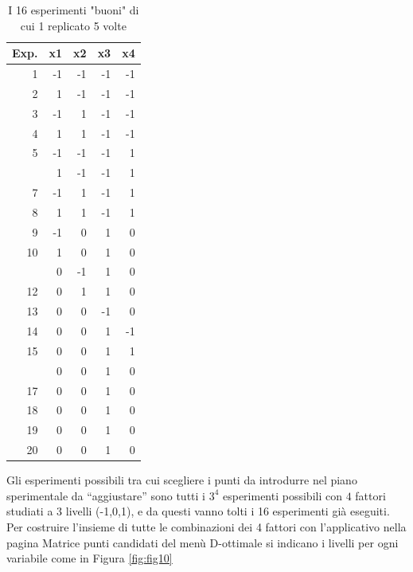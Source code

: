 \documentclass[
  11pt,
]{book}
\begin{document}
\begin{table}

\caption{\label{tab:Esbuoni}I 16 esperimenti "buoni" di cui 1 replicato 5 volte}
\centering
\begin{tabular}[t]{rrrrr}
\toprule
Exp. & x1 & x2 & x3 & x4\\
\midrule
1 & -1 & -1 & -1 & -1\\
2 & 1 & -1 & -1 & -1\\
3 & -1 & 1 & -1 & -1\\
4 & 1 & 1 & -1 & -1\\
5 & -1 & -1 & -1 & 1\\
\addlinespace
6 & 1 & -1 & -1 & 1\\
7 & -1 & 1 & -1 & 1\\
8 & 1 & 1 & -1 & 1\\
9 & -1 & 0 & 1 & 0\\
10 & 1 & 0 & 1 & 0\\
\addlinespace
11 & 0 & -1 & 1 & 0\\
12 & 0 & 1 & 1 & 0\\
13 & 0 & 0 & -1 & 0\\
14 & 0 & 0 & 1 & -1\\
15 & 0 & 0 & 1 & 1\\
\addlinespace
16 & 0 & 0 & 1 & 0\\
17 & 0 & 0 & 1 & 0\\
18 & 0 & 0 & 1 & 0\\
19 & 0 & 0 & 1 & 0\\
20 & 0 & 0 & 1 & 0\\
\bottomrule
\end{tabular}
\end{table}

Gli esperimenti possibili tra cui scegliere i punti da introdurre nel piano sperimentale da ``aggiustare'' sono tutti i \(3^4\) esperimenti possibili con \(4\) fattori studiati a \(3\) livelli (-1,0,1), e da questi vanno tolti i 16 esperimenti già eseguiti. Per costruire l'insieme di tutte le combinazioni dei 4 fattori con l'applicativo nella pagina Matrice punti candidati del menù D-ottimale si indicano i livelli per ogni variabile come in Figura \ref{fig:fig10}
\end{document}
